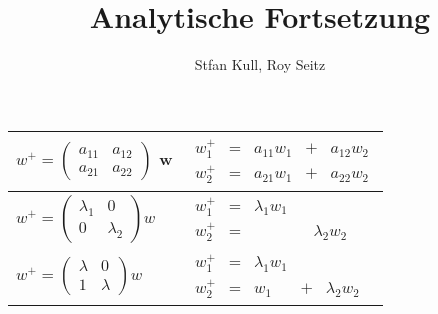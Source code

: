 \documentclass[]{article}
\author{Stfan Kull, Roy Seitz}
\title{Analytische Fortsetzung}
\begin{document}
	
\maketitle{}

\huge

\begin{tabular}{|l|l|}
	\hline
	$w^+=\begin{pmatrix}
	a_{11} & a_{12} \\ a_{21} & a_{22}
	\end{pmatrix}$ w&
	$\begin{matrix}
		w_1^{+}&=&a_{11}w_1&+&a_{12}w_2\\			w_2^{+}&=&a_{21}w_1&+&a_{22}w_2
	\end{matrix}$ \\ 
	
	\hline
	$w^+=\begin{pmatrix}
		\lambda_1 & 0 \\ 0 & \lambda_2
	\end{pmatrix}w $&
	
	$\begin{matrix}
		w_1^{+}&=&\lambda_1w_1&\\
		w_2^{+}&=&&&\lambda_2w_2
	\end{matrix}$ \\
	
	\hline	 
	$w^+=\begin{pmatrix}
	\lambda & 0 \\ 1 & \lambda
	\end{pmatrix}w$&
	
	$\begin{matrix}
		w_1^{+}&=&\lambda_1w_1&\\
		w_2^{+}&=&w_1&+&\lambda_2w_2
	\end{matrix}$\\
	\hline
\end{tabular}
\end{document}
